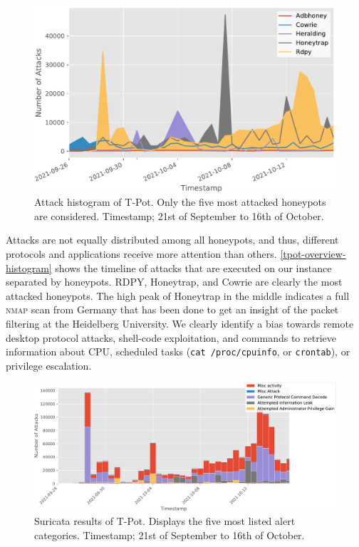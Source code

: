 \begin{figure}[ht]
    \centering
    \includegraphics[width=\textwidth]{figures/tpot-attacks-histogram.pdf}
    \caption[Attack histogram of T-Pot]{
        Attack histogram of T-Pot.
        Only the five most attacked honeypots are considered.
        Timestamp; 21st of September to 16th of October.
    }
    \label{tpot-overview-histogram}
\end{figure}

Attacks are not equally distributed among all honeypots, and thus, different protocols and applications receive more attention than others.
\autoref{tpot-overview-histogram} shows the timeline of attacks that are executed on our instance separated by honeypots.
RDPY, Honeytrap, and Cowrie are clearly the most attacked honeypots.
The high peak of Honeytrap in the middle indicates a full \textsc{nmap} scan from Germany that has been done to get an insight of the packet filtering at the Heidelberg University.
We clearly identify a bias towards remote desktop protocol attacks, shell-code exploitation, and commands to retrieve information about CPU, scheduled tasks (\verb|cat /proc/cpuinfo|, or \verb|crontab|), or privilege escalation.

\begin{figure}[ht]
    \centering
    \includegraphics[width=\textwidth]{figures/tpot-suricata-alerts.pdf}
    \caption[Suricata results of T-Pot]{
        Suricata results of T-Pot.
        Displays the five most listed alert categories.
        Timestamp; 21st of September to 16th of October.
    }
    \label{fig:suricata-results}
\end{figure}

